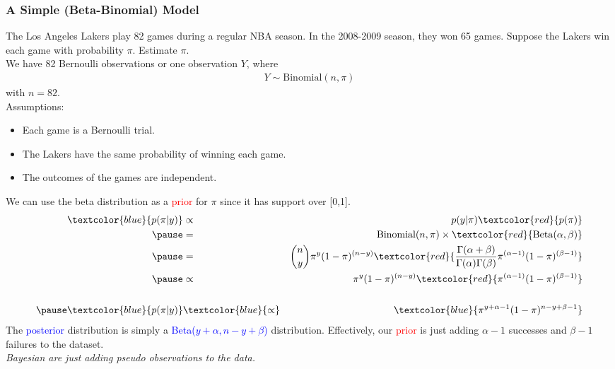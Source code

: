 \documentclass{beamer}
\begin{document}
\begin{frame}
\frametitle{A Simple (Beta-Binomial) Model}
\pause
The Los Angeles Lakers play 82 games during a regular NBA season.
\pause In the 2008-2009 season, they won 65 games.  \pause Suppose the Lakers win each
game with probability $\pi$.  \pause Estimate $\pi$. \\
\pause
\bigskip
We have 82 Bernoulli observations or one observation $Y$, where
\begin{eqnarray*}
Y \sim \mathrm{Binomial}(n, \pi)
\end{eqnarray*}
with $n=82$.\\
\bigskip
\pause
Assumptions:
\pause
\begin{itemize}
\item Each game is a Bernoulli trial.
\pause
\item The Lakers have the same probability of winning each game.  
\pause
\item The outcomes of the games are independent.
\end{itemize}
\end{frame}

\begin{frame}
We can use the beta distribution as a \textcolor{red}{prior} for
$\pi$ since it has support over [0,1].
\pause
\footnotesize
\begin{eqnarray*}
\textcolor{blue}{p(\pi | y)} &\propto& p(y | \pi) \textcolor{red}{p(\pi)} \\
\pause
&=& \mathrm{Binomial}(n, \pi) \times
\textcolor{red}{\mathrm{Beta}(\alpha, \beta)}\\
\pause
&=& \binom{n}{y} \pi^y (1 - \pi)^{(n-y)} \textcolor{red}{\frac{\Gamma (\alpha + \beta)}{\Gamma (\alpha)
\Gamma (\beta)} \pi^{(\alpha - 1)} (1 - \pi)^{(\beta-1)}}\\
\pause
&\propto& \pi^y (1 - \pi)^{(n-y)} \textcolor{red}{\pi^{(\alpha - 1)}
(1 - \pi)^{(\beta-1)}} \\\\
\pause
\textcolor{blue}{p(\pi | y)} &\textcolor{blue}{\propto}& \textcolor{blue}{\pi^{y+\alpha-1} (1-\pi)^{n-y+\beta-1}}
\end{eqnarray*}
\normalsize
\pause
The \textcolor{blue}{posterior} distribution is simply a
\textcolor{blue}{Beta($y+\alpha, n-y+\beta$)} distribution. \pause
Effectively, our \textcolor{red}{prior} is just adding $\alpha-1$
successes and $\beta - 1$ failures to the dataset.\\
\bigskip
\pause
{\it Bayesian  are just adding pseudo observations to the data.}
\end{frame}
\end{document}
